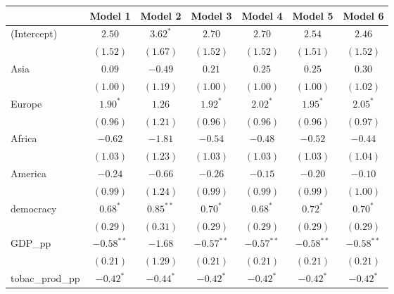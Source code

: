 
\begin{table}[!h]
\begin{center}
\begin{tabular}{l c c c c c c }
\toprule
 & Model 1 & Model 2 & Model 3 & Model 4 & Model 5 & Model 6 \\
\midrule
(Intercept)             & $2.50$       & $3.62^{*}$   & $2.70$       & $2.70$       & $2.54$       & $2.46$       \\
                        & $(1.52)$     & $(1.67)$     & $(1.52)$     & $(1.52)$     & $(1.51)$     & $(1.52)$     \\
Asia                    & $0.09$       & $-0.49$      & $0.21$       & $0.25$       & $0.25$       & $0.30$       \\
                        & $(1.00)$     & $(1.19)$     & $(1.00)$     & $(1.00)$     & $(1.00)$     & $(1.02)$     \\
Europe                  & $1.90^{*}$   & $1.26$       & $1.92^{*}$   & $2.02^{*}$   & $1.95^{*}$   & $2.05^{*}$   \\
                        & $(0.96)$     & $(1.21)$     & $(0.96)$     & $(0.96)$     & $(0.96)$     & $(0.97)$     \\
Africa                  & $-0.62$      & $-1.81$      & $-0.54$      & $-0.48$      & $-0.52$      & $-0.44$      \\
                        & $(1.03)$     & $(1.23)$     & $(1.03)$     & $(1.03)$     & $(1.03)$     & $(1.04)$     \\
America                 & $-0.24$      & $-0.66$      & $-0.26$      & $-0.15$      & $-0.20$      & $-0.10$      \\
                        & $(0.99)$     & $(1.24)$     & $(0.99)$     & $(0.99)$     & $(0.99)$     & $(1.00)$     \\
democracy               & $0.68^{*}$   & $0.85^{**}$  & $0.70^{*}$   & $0.68^{*}$   & $0.72^{*}$   & $0.70^{*}$   \\
                        & $(0.29)$     & $(0.31)$     & $(0.29)$     & $(0.29)$     & $(0.29)$     & $(0.29)$     \\
GDP\_pp                 & $-0.58^{**}$ & $-1.68$      & $-0.57^{**}$ & $-0.57^{**}$ & $-0.58^{**}$ & $-0.58^{**}$ \\
                        & $(0.21)$     & $(1.29)$     & $(0.21)$     & $(0.21)$     & $(0.21)$     & $(0.21)$     \\
tobac\_prod\_pp         & $-0.42^{*}$  & $-0.44^{*}$  & $-0.42^{*}$  & $-0.42^{*}$  & $-0.42^{*}$  & $-0.42^{*}$  \\

\end{tabular}
\end{center}
\end{table}
